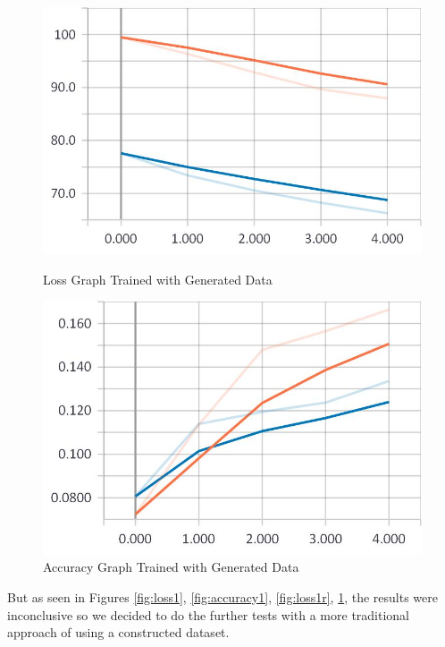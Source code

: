 \begin{figure}[htp]
\centering
\begin{minipage}{.5\textwidth}
	\centering
	\captionsetup{justification=centering,margin=2cm}
	\includegraphics[width=1\linewidth]{Illustrations/losss1r.jpg}
	\caption{Loss Graph Trained with Generated Data}
	\label{fig:loss1r}
\end{minipage}%
\begin{minipage}{.5\textwidth}
	\centering
	\captionsetup{justification=centering,margin=2cm}
	\includegraphics[width=1\linewidth]{Illustrations/accuracy1r.jpg}
	\caption{Accuracy Graph Trained with Generated Data}
	\label{fig:accuracy1r}
\end{minipage}
\end{figure}

But as seen in Figures \ref{fig:loss1}, \ref{fig:accuracy1}, \ref{fig:loss1r}, \ref{fig:accuracy1r}, the results were inconclusive so we 
decided to do the further tests with a more traditional approach of using a constructed dataset.


